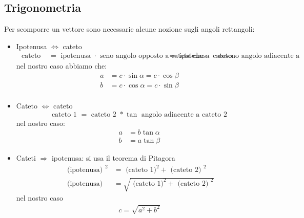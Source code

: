 \subsection{Trigonometria}\label{trigonometria}
Per scomporre un vettore sono necessarie alcune nozione sugli angoli rettangoli:
\vskip3mm
\vskip3mm
\begin{itemize}
	\item Ipotenusa $ \Leftrightarrow $ cateto
	      \begin{align*}
		      \text{ cateto } & = \text{ ipotenusa } \cdot \text{ seno angolo opposto a cateto che voglio calcolare }
		      \text{ cateto } & = \text{ ipotenusa } \cdot \text{ coseno angolo adiacente a cateto che voglio calcolare }
	      \end{align*}
	      nel nostro caso abbiamo che:
	      \begin{align*}
		      a & = c \cdot \sin  \alpha = c \cdot  \cos \beta  \\
		      b & = c \cdot \cos   \alpha = c \cdot  \sin \beta \\
	      \end{align*}
	\item Cateto $ \Leftrightarrow $ cateto
	      \[
		      \text{ cateto 1 } = \text{ cateto 2 } * \tan \text{ angolo adiacente a cateto 2 }
	      \]
	      nel nostro caso:
	      \begin{align*}
		      a & = b \tan \alpha \\
		      b & = a \tan \beta
	      \end{align*}
	\item Cateti $ \Rightarrow $ ipotenusa: si usa il teorema di Pitagora
	      \begin{align*}
		      \text{ (ipotenusa) } ^2 & = \text{ (cateto 1)} ^2 + \text{ (cateto 2) } ^2        \\
		      \text{ (ipotenusa) }    & = \sqrt{\text{ (cateto 1)} ^2 + \text{ (cateto 2) } ^2}
	      \end{align*}
	      nel nostro caso
	      \begin{align*}
		      c = \sqrt{a ^2  + b ^2 }
	      \end{align*}
\end{itemize}

